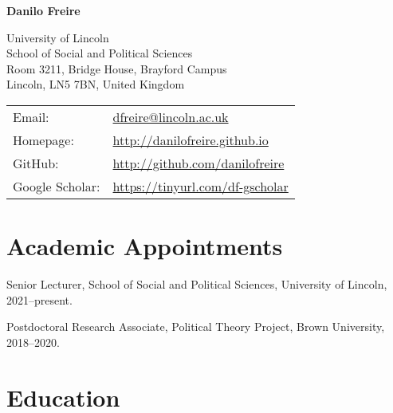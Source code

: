 \documentclass[a4paper]{article}
\def\name{Danilo Freire}
\renewenvironment{itemize}{
	\begin{list}{}{
			\setlength{\leftmargin}{1.5em}
		}
		}{
	\end{list}
}
\begin{document}
{\huge \bf \name}


\vspace{0.25in}

\begin{minipage}{0.45\linewidth}
	University of Lincoln\\
  School of Social and Political Sciences\\
	Room 3211, Bridge House, Brayford Campus\\
	Lincoln, LN5 7BN, United Kingdom
\end{minipage}
\begin{minipage}{0.45\linewidth}
	\begin{tabular}{ll}
		Email:          & \href{mailto:dfreire@lincoln.ac.uk}{dfreire@lincoln.ac.uk}          \\
		Homepage:       & \href{http://danilofreire.github.io/}{http://danilofreire.github.io} \\
		GitHub:         & \href{http://github.com/danilofreire}{http://github.com/danilofreire} \\
		Google Scholar: & \href{https://tinyurl.com/df-gscholar}{https://tinyurl.com/df-gscholar}
	\end{tabular}
	\end{minipage}

\section*{Academic Appointments}

\begin{itemize}
\item Senior Lecturer, School of Social and Political Sciences, University of Lincoln, 2021--present.
\item Postdoctoral Research Associate, Political Theory Project, Brown University, 2018--2020.
\end{itemize}

\section*{Education}
\end{document}
